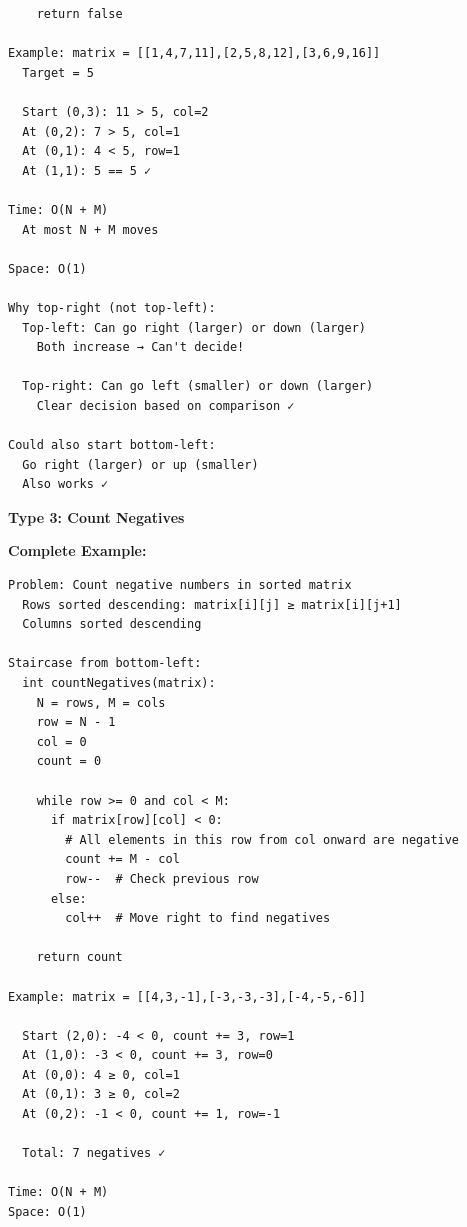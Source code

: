 \documentclass[11pt,a4paper,oneside]{book}
\begin{document}
\begin{tcolorbox}[
    enhanced,breakable,
    colback=successgreen!10,
    colframe=successgreen,
    boxrule=1.5pt,
    arc=3mm,
    title=\textbf{Complete Matrix Search Algorithms}
]
\begin{verbatim}
    return false

Example: matrix = [[1,4,7,11],[2,5,8,12],[3,6,9,16]]
  Target = 5
  
  Start (0,3): 11 > 5, col=2
  At (0,2): 7 > 5, col=1
  At (0,1): 4 < 5, row=1
  At (1,1): 5 == 5 ✓

Time: O(N + M)
  At most N + M moves
  
Space: O(1)

Why top-right (not top-left):
  Top-left: Can go right (larger) or down (larger)
    Both increase → Can't decide!
  
  Top-right: Can go left (smaller) or down (larger)
    Clear decision based on comparison ✓

Could also start bottom-left:
  Go right (larger) or up (smaller)
  Also works ✓
\end{verbatim}

\textbf{Type 3: Count Negatives}

\textbf{Complete Example:}
\begin{verbatim}
Problem: Count negative numbers in sorted matrix
  Rows sorted descending: matrix[i][j] ≥ matrix[i][j+1]
  Columns sorted descending

Staircase from bottom-left:
  int countNegatives(matrix):
    N = rows, M = cols
    row = N - 1
    col = 0
    count = 0
    
    while row >= 0 and col < M:
      if matrix[row][col] < 0:
        # All elements in this row from col onward are negative
        count += M - col
        row--  # Check previous row
      else:
        col++  # Move right to find negatives
    
    return count

Example: matrix = [[4,3,-1],[-3,-3,-3],[-4,-5,-6]]
  
  Start (2,0): -4 < 0, count += 3, row=1
  At (1,0): -3 < 0, count += 3, row=0
  At (0,0): 4 ≥ 0, col=1
  At (0,1): 3 ≥ 0, col=2
  At (0,2): -1 < 0, count += 1, row=-1
  
  Total: 7 negatives ✓

Time: O(N + M)
Space: O(1)
\end{verbatim}
\end{tcolorbox}
\end{document}
